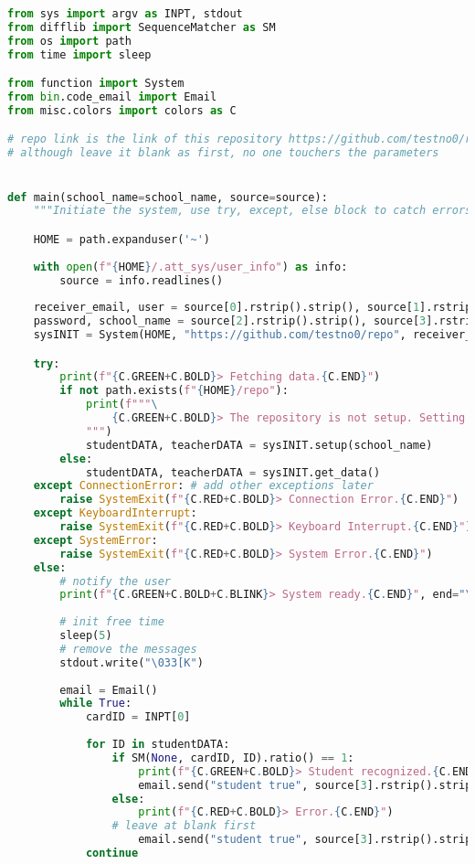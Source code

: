 \documentclass[12pt]{article}
\begin{document}
\singlespacing
\begin{lstlisting}[language=Python, caption={\texttt{code\_email.py}}]
from sys import argv as INPT, stdout
from difflib import SequenceMatcher as SM
from os import path
from time import sleep

from function import System
from bin.code_email import Email
from misc.colors import colors as C

# repo link is the link of this repository https://github.com/testno0/repo
# although leave it blank as first, no one touchers the parameters


def main(school_name=school_name, source=source):
	"""Initiate the system, use try, except, else block to catch errors and to organize the procedures based on the cases the system gives."""

	HOME = path.expanduser('~')
	
	with open(f"{HOME}/.att_sys/user_info") as info:
		source = info.readlines()
	
	receiver_email, user = source[0].rstrip().strip(), source[1].rstrip().strip() 
	password, school_name = source[2].rstrip().strip(), source[3].rstrip().strip()
	sysINIT = System(HOME, "https://github.com/testno0/repo", receiver_email)

	try:
		print(f"{C.GREEN+C.BOLD}> Fetching data.{C.END}")
		if not path.exists(f"{HOME}/repo"):
			print(f"""\
				{C.GREEN+C.BOLD}> The repository is not setup. Setting up the repository.{C.END}
			""")
			studentDATA, teacherDATA = sysINIT.setup(school_name)        
		else:
			studentDATA, teacherDATA = sysINIT.get_data()
	except ConnectionError: # add other exceptions later
		raise SystemExit(f"{C.RED+C.BOLD}> Connection Error.{C.END}")
	except KeyboardInterrupt:
		raise SystemExit(f"{C.RED+C.BOLD}> Keyboard Interrupt.{C.END}")
	except SystemError:
		raise SystemExit(f"{C.RED+C.BOLD}> System Error.{C.END}")
	else:
		# notify the user
		print(f"{C.GREEN+C.BOLD+C.BLINK}> System ready.{C.END}", end="\r")
		
		# init free time
		sleep(5)
		# remove the messages
		stdout.write("\033[K")
		
		email = Email()
		while True:
			cardID = INPT[0]            
			
			for ID in studentDATA:
				if SM(None, cardID, ID).ratio() == 1:
					print(f"{C.GREEN+C.BOLD}> Student recognized.{C.END}")
					email.send("student true", source[3].rstrip().strip(), studentDATA[ID][0])
				else:
					print(f"{C.RED+C.BOLD}> Error.{C.END}")
				# leave at blank first
					email.send("student true", source[3].rstrip().strip(), studentDATA)[ID][0]
			continue
\end{lstlisting}
\doublespacing
\end{document}
